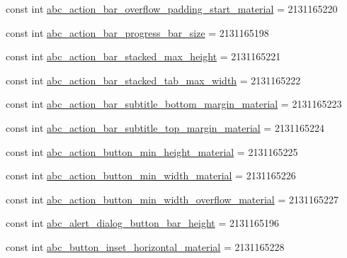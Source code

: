 \begin{DoxyCompactItemize}
\item 
const int \mbox{\hyperlink{class_f_w_p_s___app_1_1_droid_1_1_resource_1_1_dimension_af5d23b8294e78021f5403a5797a92057}{abc\+\_\+action\+\_\+bar\+\_\+overflow\+\_\+padding\+\_\+start\+\_\+material}} = 2131165220
\item 
const int \mbox{\hyperlink{class_f_w_p_s___app_1_1_droid_1_1_resource_1_1_dimension_a41a5ffc63e666beb6b56e98059926eee}{abc\+\_\+action\+\_\+bar\+\_\+progress\+\_\+bar\+\_\+size}} = 2131165198
\item 
const int \mbox{\hyperlink{class_f_w_p_s___app_1_1_droid_1_1_resource_1_1_dimension_a13d7f072f7b2f7c1bc46d043861ffec9}{abc\+\_\+action\+\_\+bar\+\_\+stacked\+\_\+max\+\_\+height}} = 2131165221
\item 
const int \mbox{\hyperlink{class_f_w_p_s___app_1_1_droid_1_1_resource_1_1_dimension_a94cd72529355975015be84e23b7193cb}{abc\+\_\+action\+\_\+bar\+\_\+stacked\+\_\+tab\+\_\+max\+\_\+width}} = 2131165222
\item 
const int \mbox{\hyperlink{class_f_w_p_s___app_1_1_droid_1_1_resource_1_1_dimension_aaf84e0724bf27be5c61cbe2965419902}{abc\+\_\+action\+\_\+bar\+\_\+subtitle\+\_\+bottom\+\_\+margin\+\_\+material}} = 2131165223
\item 
const int \mbox{\hyperlink{class_f_w_p_s___app_1_1_droid_1_1_resource_1_1_dimension_a9bee55449e9d6fcc61d264ba267813c0}{abc\+\_\+action\+\_\+bar\+\_\+subtitle\+\_\+top\+\_\+margin\+\_\+material}} = 2131165224
\item 
const int \mbox{\hyperlink{class_f_w_p_s___app_1_1_droid_1_1_resource_1_1_dimension_aa5b71db751f8d289e91415f97efb8851}{abc\+\_\+action\+\_\+button\+\_\+min\+\_\+height\+\_\+material}} = 2131165225
\item 
const int \mbox{\hyperlink{class_f_w_p_s___app_1_1_droid_1_1_resource_1_1_dimension_aad437a03f93e293af87a73adfd512ff2}{abc\+\_\+action\+\_\+button\+\_\+min\+\_\+width\+\_\+material}} = 2131165226
\item 
const int \mbox{\hyperlink{class_f_w_p_s___app_1_1_droid_1_1_resource_1_1_dimension_aa829c1d1e4cd64941cc3456281559cea}{abc\+\_\+action\+\_\+button\+\_\+min\+\_\+width\+\_\+overflow\+\_\+material}} = 2131165227
\item 
const int \mbox{\hyperlink{class_f_w_p_s___app_1_1_droid_1_1_resource_1_1_dimension_a89a3ff738e3f016434297df37bdad28e}{abc\+\_\+alert\+\_\+dialog\+\_\+button\+\_\+bar\+\_\+height}} = 2131165196
\item 
const int \mbox{\hyperlink{class_f_w_p_s___app_1_1_droid_1_1_resource_1_1_dimension_ac1dcf08c57289d61a3202a3fc73e590b}{abc\+\_\+button\+\_\+inset\+\_\+horizontal\+\_\+material}} = 2131165228

\end{DoxyCompactItemize}

